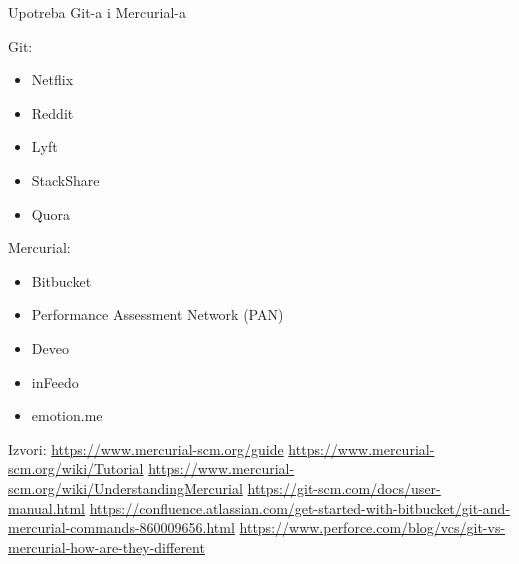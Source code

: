 \documentclass{beamer}
\begin{document}
\begin{frame}{Upotreba Git-a i Mercurial-a}
\begin{multicols}{2}
Git:
\begin{itemize}
    \item Netflix
    \item Reddit 
    \item Lyft
    \item StackShare
    \item Quora
\end{itemize}

\columnbreak
Mercurial:
\begin{itemize}
    \item Bitbucket
    \item Performance Assessment Network (PAN)
    \item Deveo
    \item inFeedo
    \item emotion.me
\end{itemize}

\end{multicols}
\end{frame}

\begin{frame}{Izvori:}
\url{https://www.mercurial-scm.org/guide}
\newline
\newline
\url{https://www.mercurial-scm.org/wiki/Tutorial}
\newline
\newline
\url{https://www.mercurial-scm.org/wiki/UnderstandingMercurial}
\newline
\newline
\url{https://git-scm.com/docs/user-manual.html}
\newline
\newline
\url{https://confluence.atlassian.com/get-started-with-bitbucket/git-and-mercurial-commands-860009656.html}
\newline
\newline
\url{https://www.perforce.com/blog/vcs/git-vs-mercurial-how-are-they-different}
\end{frame}
\end{document}
